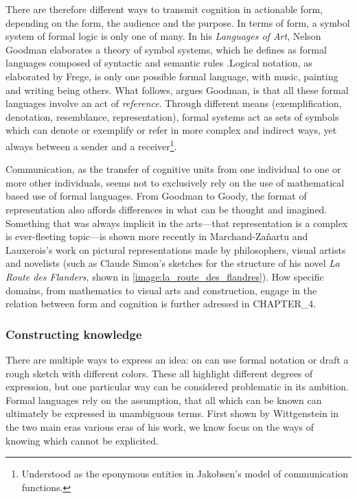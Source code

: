 There are therefore different ways to transmit cognition in actionable form, depending on the form, the audience and the purpose. In terms of form, a symbol system of formal logic is only one of many. In his \emph{Languages of Art}, Nelson Goodman elaborates a theory of symbol systems, which he defines as formal languages composed of syntactic and semantic rules \citep{goodman_languages_1976}.Logical notation, as elaborated by Frege, is only one possible formal language, with music, painting and writing being others. What follows, argues Goodman, is that all these formal languages involve an act of \emph{reference}. Through different means (exemplification, denotation, resemblance, representation), formal systems act as sets of symbols which can denote or exemplify or refer in more complex and indirect ways, yet always between a sender and a receiver\footnote{Understood as the eponymous entities  in Jakobsen's model of communication functions.}.

Communication, as the transfer of cognitive units from one individual to one or more other individuals, seems not to exclusively rely on the use of mathematical based use of formal languages. From Goodman to Goody, the format of representation also affords differences in what can be thought and imagined. Something that was always implicit in the arts—that representation is a complex is ever-fleeting topic—is shown more recently in Marchand-Zañartu and Lauxerois's work on pictural representations made by philosophers, visual artists and novelists (such as Claude Simon's sketches for the structure of his novel \emph{La Route des Flanders}, shown in \ref{image:la_route_des_flandres})\citep{marchand-zanartu_32_2022}. How specific domains, from mathematics to visual arts and construction, engage in the relation between form and cognition is further adressed in CHAPTER_4.


\subsubsection{Constructing knowledge}

There are multiple ways to express an idea: on can use formal notation or draft a rough sketch with different colors. These all highlight different degrees of expression, but one particular way can be considered problematic in its ambition.  Formal languages rely on the assumption, that all which can be known can ultimately be expressed in unambiguous terms. First shown by Wittgenstein in the two main eras various eras of his work, we know focus on the ways of knowing which cannot be explicited.


